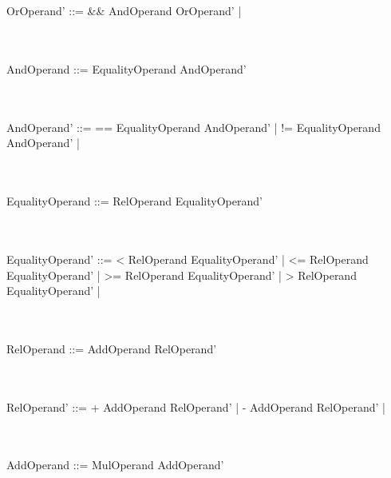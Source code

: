 \documentclass[a4paper,portrait,12pt]{article}
\begin{document}
\\~\\
OrOperand' ::=	\&\& AndOperand OrOperand'				\newline
\hspace*{.625in} | \epsilon

\\~\\
AndOperand ::=	EqualityOperand	AndOperand'

\\~\\
AndOperand' ::=	== EqualityOperand AndOperand'	\newline
\hspace*{.625in} | != EqualityOperand AndOperand'	\newline
\hspace*{.625in} | \epsilon

\\~\\
EqualityOperand ::=	RelOperand EqualityOperand'

\\~\\
EqualityOperand' ::=	< RelOperand EqualityOperand'	\newline
\hspace*{.625in} | <= RelOperand EqualityOperand'		\newline
\hspace*{.625in} | >= RelOperand EqualityOperand'		\newline
\hspace*{.625in} | > RelOperand	EqualityOperand'		\newline
\hspace*{.625in} | \epsilon

\\~\\
RelOperand ::=	AddOperand RelOperand'			\newline

\\~\\
RelOperand' ::=	+ AddOperand RelOperand'		\newline
\hspace*{.625in} | - AddOperand	RelOperand' 	\newline
\hspace*{.625in} | \epsilon

\\~\\
AddOperand ::=	MulOperand AddOperand'			\newline
\end{document}
